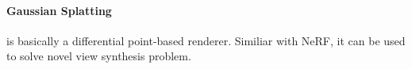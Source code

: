 \paragraph{Gaussian Splatting} is basically a differential point-based renderer. Similiar with NeRF, it can be used to solve novel view synthesis problem.



